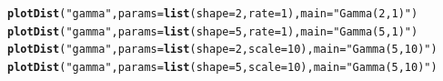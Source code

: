 \documentclass[twoside]{book}\usepackage[]{graphicx}\usepackage[]{xcolor}
\makeatletter
\newcommand{\hlnum}[1]{\textcolor[rgb]{0.686,0.059,0.569}{#1}}%
\newcommand{\hlstr}[1]{\textcolor[rgb]{0.192,0.494,0.8}{#1}}%
\newcommand{\hlstd}[1]{\textcolor[rgb]{0.345,0.345,0.345}{#1}}%
\newcommand{\hlkwc}[1]{\textcolor[rgb]{0.333,0.667,0.333}{#1}}%
\newcommand{\hlkwd}[1]{\textcolor[rgb]{0.737,0.353,0.396}{\textbf{#1}}}%
\newenvironment{kframe}{%
 \def\at@end@of@kframe{}%
 \ifinner\ifhmode%
  \def\at@end@of@kframe{\end{minipage}}%
  \begin{minipage}{\columnwidth}%
 \fi\fi%
 \def\FrameCommand##1{\hskip\@totalleftmargin \hskip-\fboxsep
 \colorbox{shadecolor}{##1}\hskip-\fboxsep
     \hskip-\linewidth \hskip-\@totalleftmargin \hskip\columnwidth}%
 \MakeFramed {\advance\hsize-\width
   \@totalleftmargin\z@ \linewidth\hsize
   \@setminipage}}%
 {\par\unskip\endMakeFramed%
 \at@end@of@kframe}
\newenvironment{knitrout}{}{} %
\makeatother
\begin{document}
\begin{knitrout}
\color{fgcolor}\begin{kframe}
\begin{alltt}
\hlkwd{plotDist}\hlstd{(}\hlstr{"gamma"}\hlstd{,} \hlkwc{params}\hlstd{=}\hlkwd{list}\hlstd{(}\hlkwc{shape}\hlstd{=}\hlnum{2}\hlstd{,} \hlkwc{rate}\hlstd{=}\hlnum{1}\hlstd{),} \hlkwc{main}\hlstd{=}\hlstr{"Gamma(2,1)"}\hlstd{)}
\hlkwd{plotDist}\hlstd{(}\hlstr{"gamma"}\hlstd{,} \hlkwc{params}\hlstd{=}\hlkwd{list}\hlstd{(}\hlkwc{shape}\hlstd{=}\hlnum{5}\hlstd{,} \hlkwc{rate}\hlstd{=}\hlnum{1}\hlstd{),} \hlkwc{main}\hlstd{=}\hlstr{"Gamma(5,1)"}\hlstd{)}
\hlkwd{plotDist}\hlstd{(}\hlstr{"gamma"}\hlstd{,} \hlkwc{params}\hlstd{=}\hlkwd{list}\hlstd{(}\hlkwc{shape}\hlstd{=}\hlnum{2}\hlstd{,} \hlkwc{scale}\hlstd{=}\hlnum{10}\hlstd{),} \hlkwc{main}\hlstd{=}\hlstr{"Gamma(5,10)"}\hlstd{)}
\hlkwd{plotDist}\hlstd{(}\hlstr{"gamma"}\hlstd{,} \hlkwc{params}\hlstd{=}\hlkwd{list}\hlstd{(}\hlkwc{shape}\hlstd{=}\hlnum{5}\hlstd{,} \hlkwc{scale}\hlstd{=}\hlnum{10}\hlstd{),} \hlkwc{main}\hlstd{=}\hlstr{"Gamma(5,10)"}\hlstd{)}
\end{alltt}
\end{kframe}


\end{knitrout}
\end{document}
